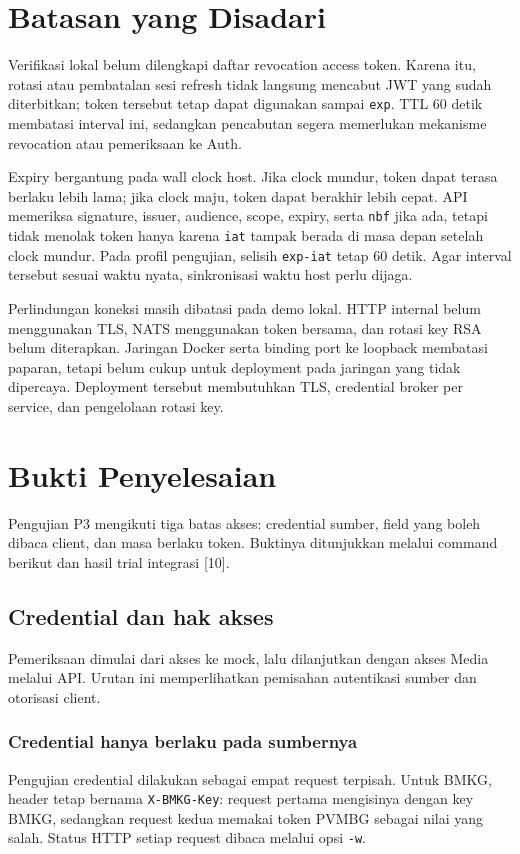 \section{Batasan yang Disadari}
Verifikasi lokal belum dilengkapi daftar revocation access token. Karena itu, rotasi atau pembatalan sesi refresh tidak langsung mencabut JWT yang sudah diterbitkan; token tersebut tetap dapat digunakan sampai \texttt{exp}. TTL 60 detik membatasi interval ini, sedangkan pencabutan segera memerlukan mekanisme revocation atau pemeriksaan ke Auth.

Expiry bergantung pada wall clock host. Jika clock mundur, token dapat terasa berlaku lebih lama; jika clock maju, token dapat berakhir lebih cepat. API memeriksa signature, issuer, audience, scope, expiry, serta \texttt{nbf} jika ada, tetapi tidak menolak token hanya karena \texttt{iat} tampak berada di masa depan setelah clock mundur. Pada profil pengujian, selisih \texttt{exp-iat} tetap 60 detik. Agar interval tersebut sesuai waktu nyata, sinkronisasi waktu host perlu dijaga.

Perlindungan koneksi masih dibatasi pada demo lokal. HTTP internal belum menggunakan TLS, NATS menggunakan token bersama, dan rotasi key RSA belum diterapkan. Jaringan Docker serta binding port ke loopback membatasi paparan, tetapi belum cukup untuk deployment pada jaringan yang tidak dipercaya. Deployment tersebut membutuhkan TLS, credential broker per service, dan pengelolaan rotasi key.

\section{Bukti Penyelesaian}
Pengujian P3 mengikuti tiga batas akses: credential sumber, field yang boleh dibaca client, dan masa berlaku token. Buktinya ditunjukkan melalui command berikut dan hasil trial integrasi [10].

\subsection{Credential dan hak akses}
Pemeriksaan dimulai dari akses ke mock, lalu dilanjutkan dengan akses Media melalui API. Urutan ini memperlihatkan pemisahan autentikasi sumber dan otorisasi client.

\subsubsection{Credential hanya berlaku pada sumbernya}
Pengujian credential dilakukan sebagai empat request terpisah. Untuk BMKG, header tetap bernama \texttt{X-BMKG-Key}: request pertama mengisinya dengan key BMKG, sedangkan request kedua memakai token PVMBG sebagai nilai yang salah. Status HTTP setiap request dibaca melalui opsi \texttt{-w}.

